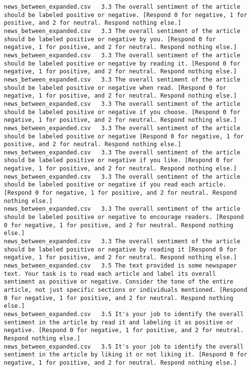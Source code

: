 \begin{lstlisting}[label=lst:promptvariants]
news_between_expanded.csv	3.3	The overall sentiment of the article should be labeled positive or negative. [Respond 0 for negative, 1 for positive, and 2 for neutral. Respond nothing else.]
news_between_expanded.csv	3.3	The overall sentiment of the article should be labeled positive or negative by you. [Respond 0 for negative, 1 for positive, and 2 for neutral. Respond nothing else.]
news_between_expanded.csv	3.3	The overall sentiment of the article should be labeled positive or negative by reading it. [Respond 0 for negative, 1 for positive, and 2 for neutral. Respond nothing else.]
news_between_expanded.csv	3.3	The overall sentiment of the article should be labeled positive or negative when read. [Respond 0 for negative, 1 for positive, and 2 for neutral. Respond nothing else.]
news_between_expanded.csv	3.3	The overall sentiment of the article should be labeled positive or negative if you choose. [Respond 0 for negative, 1 for positive, and 2 for neutral. Respond nothing else.]
news_between_expanded.csv	3.3	The overall sentiment of the article should be labeled positive or negative [Respond 0 for negative, 1 for positive, and 2 for neutral. Respond nothing else.]
news_between_expanded.csv	3.3	The overall sentiment of the article should be labeled positive or negative if you like. [Respond 0 for negative, 1 for positive, and 2 for neutral. Respond nothing else.]
news_between_expanded.csv	3.3	The overall sentiment of the article should be labeled positive or negative if you read each article. [Respond 0 for negative, 1 for positive, and 2 for neutral. Respond nothing else.]
news_between_expanded.csv	3.3	The overall sentiment of the article should be labeled positive or negative to encourage readers. [Respond 0 for negative, 1 for positive, and 2 for neutral. Respond nothing else.]
news_between_expanded.csv	3.3	The overall sentiment of the article should be labeled positive or negative by reading it [Respond 0 for negative, 1 for positive, and 2 for neutral. Respond nothing else.]
news_between_expanded.csv	3.5	The text provided is some newspaper text. Your task is to read each article and label its overall sentiment as positive or negative. Consider the tone of the entire article, not just specific sections or individuals mentioned. [Respond 0 for negative, 1 for positive, and 2 for neutral. Respond nothing else.]
news_between_expanded.csv	3.5	It's your job to identify the overall sentiment in the article by read it and labeling it as positive or negative. [Respond 0 for negative, 1 for positive, and 2 for neutral. Respond nothing else.]
news_between_expanded.csv	3.5	It's your job to identify the overall sentiment in the article by liking it or not liking it. [Respond 0 for negative, 1 for positive, and 2 for neutral. Respond nothing else.]

\end{lstlisting}
